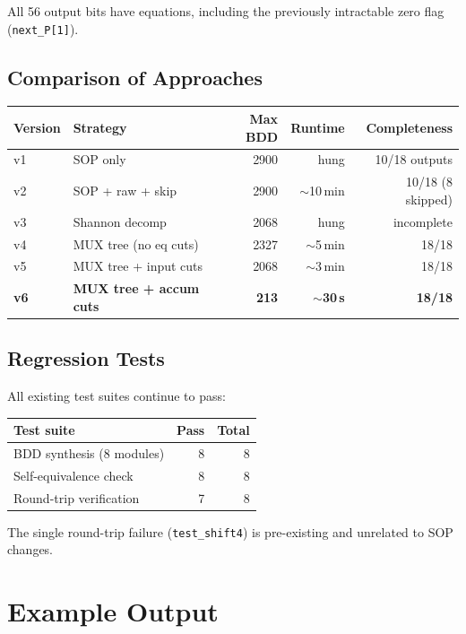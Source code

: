 \documentclass[11pt]{article}
\begin{document}
All 56 output bits have equations, including the previously
intractable zero flag (\texttt{next\_P[1]}).

\subsection{Comparison of Approaches}

\begin{center}
\begin{tabular}{@{}llrrr@{}}
\toprule
Version & Strategy & Max BDD & Runtime & Completeness \\
\midrule
v1 & SOP only & 2900 & hung & 10/18 outputs \\
v2 & SOP + raw + skip & 2900 & $\sim$10\,min & 10/18 (8 skipped) \\
v3 & Shannon decomp & 2068 & hung & incomplete \\
v4 & MUX tree (no eq cuts) & 2327 & $\sim$5\,min & 18/18 \\
v5 & MUX tree + input cuts & 2068 & $\sim$3\,min & 18/18 \\
\textbf{v6} & \textbf{MUX tree + accum cuts} & \textbf{213} &
  \textbf{$\sim$30\,s} & \textbf{18/18} \\
\bottomrule
\end{tabular}
\end{center}

\subsection{Regression Tests}

All existing test suites continue to pass:

\begin{center}
\begin{tabular}{@{}lrr@{}}
\toprule
Test suite & Pass & Total \\
\midrule
BDD synthesis (8 modules) & 8 & 8 \\
Self-equivalence check & 8 & 8 \\
Round-trip verification & 7 & 8 \\
\bottomrule
\end{tabular}
\end{center}

The single round-trip failure (\texttt{test\_shift4}) is pre-existing
and unrelated to SOP changes.

\section{Example Output}
\end{document}
